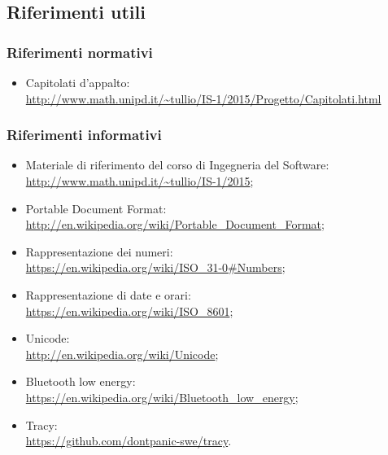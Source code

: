 \documentclass[../NormeProgetto.tex]{subfiles}
\begin{document}
	\subsection{Riferimenti utili}
		\subsubsection{Riferimenti normativi}
		\begin{itemize}
			\item Capitolati d'appalto: \\\url{http://www.math.unipd.it/~tullio/IS-1/2015/Progetto/Capitolati.html}
		\end{itemize}
		\subsubsection{Riferimenti informativi}
		\begin{itemize}
			\item Materiale di riferimento del corso di Ingegneria del Software: \\\url{http://www.math.unipd.it/~tullio/IS-1/2015};
			\item Portable Document Format:  \\\url{http://en.wikipedia.org/wiki/Portable_Document_Format};
			\item Rappresentazione dei numeri: \\\url{https://en.wikipedia.org/wiki/ISO_31-0#Numbers};
			\item Rappresentazione di date e orari: \\\url{https://en.wikipedia.org/wiki/ISO_8601};
			\item Unicode: \\\url{http://en.wikipedia.org/wiki/Unicode};
			\item Bluetooth low energy: \\\url{https://en.wikipedia.org/wiki/Bluetooth_low_energy};
			\item Tracy: \\\url{https://github.com/dontpanic-swe/tracy}.
		\end{itemize}
\end{document}
